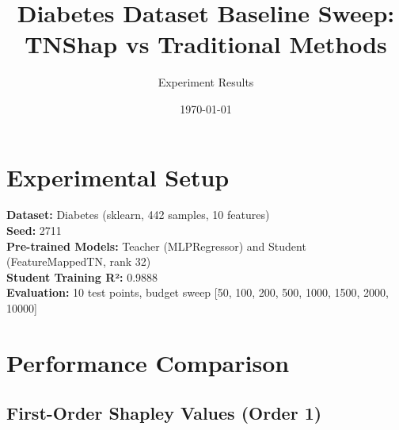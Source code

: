 \documentclass{article}
\title{Diabetes Dataset Baseline Sweep: TNShap vs Traditional Methods}
\author{Experiment Results}
\date{\today}
\begin{document}
\maketitle

\section{Experimental Setup}

\textbf{Dataset:} Diabetes (sklearn, 442 samples, 10 features) \\
\textbf{Seed:} 2711 \\
\textbf{Pre-trained Models:} Teacher (MLPRegressor) and Student (FeatureMappedTN, rank 32) \\
\textbf{Student Training R²:} 0.9888 \\
\textbf{Evaluation:} 10 test points, budget sweep [50, 100, 200, 500, 1000, 1500, 2000, 10000]

\section{Performance Comparison}

\subsection{First-Order Shapley Values (Order 1)}
\end{document}
